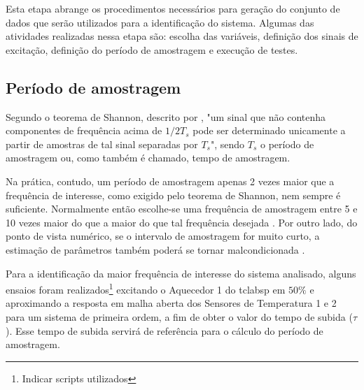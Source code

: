 Esta etapa abrange os procedimentos necessários para geração do conjunto de dados que serão utilizados
para a identificação do sistema. Algumas das atividades realizadas nessa etapa são: escolha das variáveis,
definição dos sinais de excitação, definição do período de amostragem e execução de testes.
\cite{Aguirre2015}

\subsection{Período de amostragem}
\label{subsec:periodo_de_amostragem}

Segundo o teorema de Shannon, descrito por , "um sinal que não contenha componentes
de frequência acima de $1/2T_s$ pode ser determinado unicamente a partir de amostras de tal sinal separadas
por $T_s$", sendo $T_s$ o período de amostragem ou, como também é chamado, tempo de amostragem.

Na prática, contudo, um período de amostragem apenas 2 vezes maior que a frequência de interesse, como exigido
pelo teorema de Shannon, nem sempre é suficiente. Normalmente então escolhe-se uma frequência de amostragem
entre 5 e 10 vezes maior do que a maior do que tal frequência desejada \cite{Aguirre2015}. Por outro lado, do
ponto de vista numérico, se o intervalo de amostragem for muito curto, a estimação de parâmetros também
poderá se tornar malcondicionada \cite{Aguirre2015}.

Para a identificação da maior frequência de interesse do sistema analisado, alguns ensaios foram realizados\footnote{
    Indicar scripts utilizados          %
}
excitando o Aquecedor 1 do \acrshort{tclabsp} em $50\%$ e aproximando a resposta em malha aberta dos
Sensores de Temperatura 1 e 2 para um sistema de primeira ordem, a fim de obter o valor do tempo de subida
($\tau$). Esse tempo de subida servirá de referência para o cálculo do período de amostragem.


